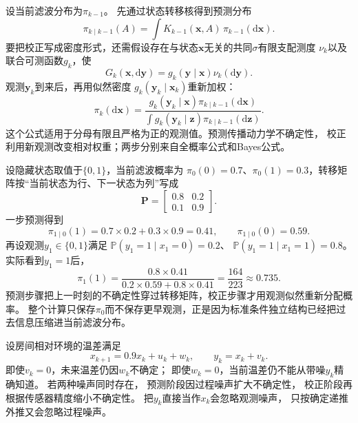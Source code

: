 设当前滤波分布为$\pi_{k-1}$。 先通过状态转移核得到预测分布
\begin{equation}
	\pi_{k\mid k-1}(A) = \int K_{k-1}(\bm{x},A) \,\pi_{k-1}(\mathrm{d}\bm{x}). \label{eq:dynamical-general-prediction-kernel}
\end{equation}
要把校正写成密度形式，还需假设存在与状态$\bm{x}$无关的共同$\sigma$有限支配测度
$\nu_k$以及联合可测函数$g_k$，使
\[
	G_k(\bm{x},\mathrm{d}\bm{y})
	=g_k(\bm{y}\mid\bm{x})\nu_k(\mathrm{d}\bm{y}).
\]
观测$\bm{y}_{k}$到来后，再用似然密度
$g_{k}(\bm{y}_{k}\mid\bm{x}_{k})$重新加权：
\begin{equation}
	\pi_{k}(\mathrm{d}\bm{x}) =
	\frac{g_{k}(\bm{y}_{k}\mid\bm{x})\pi_{k\mid k-1}(\mathrm{d}\bm{x})}
	{\int g_{k}(\bm{y}_{k}\mid\bm{z})\pi_{k\mid k-1}(\mathrm{d}\bm{z})}. \label{eq:dynamical-general-bayes-filter}
\end{equation}
这个公式适用于分母有限且严格为正的观测值。预测传播动力学不确定性，
校正利用新观测改变相对权重；两步分别来自全概率公式和Bayes公式。

\begin{example}[两状态模型的一次预测与校正]
	\label{ex:dynamical-two-state-bayes-filter}
	设隐藏状态取值于$\{0,1\}$，当前滤波概率为
	$\pi_0(0)=0.7$、$\pi_0(1)=0.3$，转移矩阵按“当前状态为行、下一状态为列”写成
	\[
		\bm{P}=
		\begin{bmatrix}
			0.8 & 0.2\\
			0.1 & 0.9
		\end{bmatrix}.
	\]
	一步预测得到
	\[
		\pi_{1\mid0}(1)=0.7\times0.2+0.3\times0.9=0.41,\qquad
		\pi_{1\mid0}(0)=0.59.
	\]
	再设观测$y_1\in\{0,1\}$满足
	$\mathbb{P}(y_1=1\mid x_1=0)=0.2$、
	$\mathbb{P}(y_1=1\mid x_1=1)=0.8$。实际看到$y_1=1$后，
	\[
		\pi_1(1)
		=\frac{0.8\times0.41}{0.2\times0.59+0.8\times0.41}
		=\frac{164}{223}\approx0.735.
	\]
	预测步骤把上一时刻的不确定性穿过转移矩阵，校正步骤才用观测似然重新分配概率。
	整个计算只保存$\pi_0$而不保存更早观测，正是因为标准条件独立结构已经把过去信息压缩进当前滤波分布。
\end{example}

\begin{example}[带泄漏温度的间接观测]
	\label{ex:dynamical-noisy-temperature} 设房间相对环境的温差满足
	\[
		x_{k+1}=0.9x_{k}+u_{k}+w_{k}, \qquad y_{k}=x_{k}+v_{k}.
	\]
	即使$v_{k}=0$，未来温差仍因$w_{k}$不确定； 即使$w_{k}=0$，当前温差仍不能从带噪$y
	_{k}$精确知道。 若两种噪声同时存在， 预测阶段因过程噪声扩大不确定性， 校正阶段再根据传感器精度缩小不确定性。
	把$y_{k}$直接当作$x_{k}$会忽略观测噪声， 只按确定递推外推又会忽略过程噪声。
\end{example}

